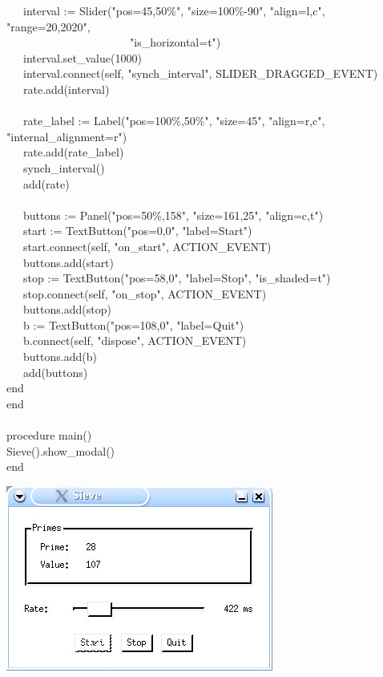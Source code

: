 {\>   \ \ \ interval :=
Slider("pos=45,50\%",
"size=100\%-90",
"align=l,c",
"range=20,2020", \\
\>   \ \ \ \ \ \ \ \ \ \ \ \ \ \ \ \ \ \ \ \ \ \ "is\_horizontal=t") \\
\>   \ \ \ interval.set\_value(1000) \\
\>   \ \ \ interval.connect(self,
"synch\_interval", SLIDER\_DRAGGED\_EVENT) \\
\>   \ \ \ rate.add(interval) \\
\ \\
\>   \ \ \ rate\_label :=
Label("pos=100\%,50\%",
"size=45",
"align=r,c",
"internal\_alignment=r") \\
\>   \ \ \ rate.add(rate\_label) \\
\>   \ \ \ synch\_interval() \\
\>   \ \ \ add(rate) \\
\ \\
\>   \ \ \ buttons := Panel("pos=50\%,158",
"size=161,25",
"align=c,t") \\
\>   \ \ \ start := TextButton("pos=0,0",
"label=Start") \\
\>   \ \ \ start.connect(self, "on\_start",
ACTION\_EVENT) \\
\>   \ \ \ buttons.add(start) \\
\>   \ \ \ stop := TextButton("pos=58,0",
"label=Stop",
"is\_shaded=t") \\
\>   \ \ \ stop.connect(self, "on\_stop",
ACTION\_EVENT) \\
\>   \ \ \ buttons.add(stop) \\
\>   \ \ \ b := TextButton("pos=108,0",
"label=Quit") \\
\>   \ \ \ b.connect(self, "dispose",
ACTION\_EVENT) \\
\>   \ \ \ buttons.add(b) \\
\>   \ \ \ add(buttons) \\
\>   end \\
end \\
\ \\
procedure main() \\
\>   Sieve().show\_modal() \\
end
}

\bigskip

\begin{center}
\includegraphics[width=3.4575in,height=2.3953in]{ub-img/ub-img58.jpg}
\end{center}

